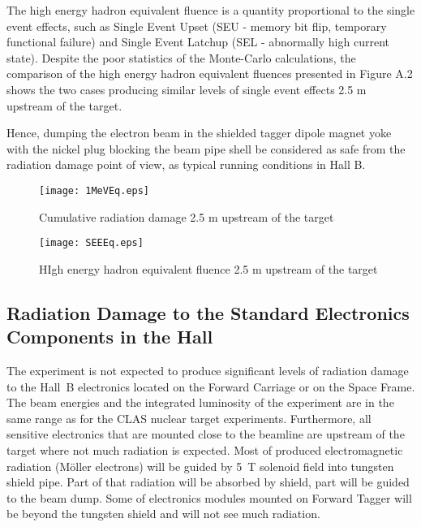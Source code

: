 \documentclass [12pt]{article}
\begin{document}
\begin{appendices}
The high energy hadron equivalent fluence is a quantity proportional to the single event effects, such as Single Event Upset (SEU - memory bit flip, temporary functional failure) and Single Event Latchup (SEL - abnormally high current state). Despite the poor statistics of the Monte-Carlo calculations, the comparison of the high energy hadron equivalent fluences presented in Figure A.2 shows the two cases producing similar levels of single event effects 2.5 m upstream of the target.

Hence, dumping the electron beam in the shielded tagger dipole magnet yoke with the nickel plug blocking the beam pipe shell be considered as safe from the radiation damage point of view, as typical running conditions in Hall B.

\begin{figure}[H]
\caption{Cumulative radiation damage 2.5 m upstream of the target}
\texttt{[image: 1MeVEq.eps]}
\centering
\end{figure}

\begin{figure}[H]
\caption{HIgh energy hadron equivalent fluence 2.5 m upstream of the target}
\texttt{[image: SEEEq.eps]}
\centering
\end{figure}

\subsection{Radiation Damage to the Standard Electronics Components in the Hall}

The experiment is not expected to produce significant levels of radiation damage to the Hall~B 
electronics located on the Forward Carriage or on the Space Frame. The beam  energies and the integrated luminosity of the experiment are in the same range as for the CLAS 
nuclear target experiments. Furthermore, all sensitive electronics that are mounted close to the 
beamline are upstream of the target where not much radiation is expected. Most of produced 
electromagnetic radiation (M{\"o}ller electrons) will be guided by 5~T solenoid field into tungsten 
shield pipe. Part of that radiation will be absorbed by shield, part will be guided to the beam 
dump. Some of electronics modules mounted on Forward Tagger will be beyond the tungsten shield 
and will not see much radiation.
\end{appendices}
\end{document}
